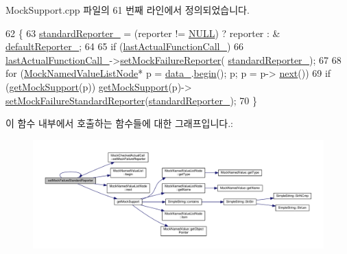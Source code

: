 Mock\+Support.\+cpp 파일의 61 번째 라인에서 정의되었습니다.


\begin{DoxyCode}
62 \{
63     \hyperlink{class_mock_support_a6df54f7f57d625cc6c06c838e37c76c0}{standardReporter\_} = (reporter != \hyperlink{openavb__types__base__pub_8h_a070d2ce7b6bb7e5c05602aa8c308d0c4}{NULL}) ? reporter : &
      \hyperlink{class_mock_support_a6af0203dcca7655959d71608423a6bfc}{defaultReporter\_};
64 
65     \textcolor{keywordflow}{if} (\hyperlink{class_mock_support_aadd48976efe51d36597ebe298e6b9233}{lastActualFunctionCall\_})
66         \hyperlink{class_mock_support_aadd48976efe51d36597ebe298e6b9233}{lastActualFunctionCall\_}->\hyperlink{class_mock_checked_actual_call_a1b9b1fb529e5087761657bfdabe4ea12}{setMockFailureReporter}(
      \hyperlink{class_mock_support_a6df54f7f57d625cc6c06c838e37c76c0}{standardReporter\_});
67 
68     \textcolor{keywordflow}{for} (\hyperlink{class_mock_named_value_list_node}{MockNamedValueListNode}* p = \hyperlink{class_mock_support_a26b06d2d43a7804c9aa5808409c0c1ee}{data\_}.\hyperlink{class_mock_named_value_list_a4a5976d05542385eb64ea73eee7fc59c}{begin}(); p; p = p->
      \hyperlink{class_mock_named_value_list_node_adaf0ca3232d35f7efae1bade86b8027e}{next}())
69         \textcolor{keywordflow}{if} (\hyperlink{class_mock_support_a575951d416e49f54fd1a3fc4823609e3}{getMockSupport}(p)) \hyperlink{class_mock_support_a575951d416e49f54fd1a3fc4823609e3}{getMockSupport}(p)->
      \hyperlink{class_mock_support_a05cf05670025073bd4011757b7cdc078}{setMockFailureStandardReporter}(\hyperlink{class_mock_support_a6df54f7f57d625cc6c06c838e37c76c0}{standardReporter\_});
70 \}
\end{DoxyCode}


이 함수 내부에서 호출하는 함수들에 대한 그래프입니다.\+:
\nopagebreak
\begin{figure}[H]
\begin{center}
\leavevmode
\includegraphics[width=350pt]{class_mock_support_a05cf05670025073bd4011757b7cdc078_cgraph}
\end{center}
\end{figure}




